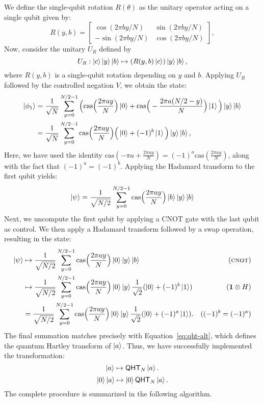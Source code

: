 \documentclass[12pt]{report}
\newcommand{\cas}{\mathrm{cas}}
\newcommand{\qht}{\mathsf{QHT}}
\begin{document}
We define the single-qubit rotation \( R(\theta) \) as the unitary operator acting on a single qubit given by:
\begin{equation}
    \label{eq:sine-rot}
    R(y, b) = 
    \begin{bmatrix}
        \cos(2\pi b y / N) & \sin(2\pi b y / N) \\
        -\sin(2\pi b y / N) & \cos(2\pi b y / N)
    \end{bmatrix},
\end{equation}
Now, consider the unitary \( U_R \) defined by
\[
U_R : \ket{c}\ket{y}\ket{b} \mapsto \left(R(y, b)\ket{c}\right)\ket{y}\ket{b},
\]
where \( R(y, b) \) is a single-qubit rotation depending on \( y \) and \( b \). Applying \( U_R \) followed by the controlled negation \( V \), we obtain the state:
\begin{align*}
    \ket{\phi_1}
    & = \frac{1}{\sqrt{N}} \sum_{y = 0}^{N / 2 - 1} \Big( \cas\Big( \frac{2\pi ay}{N} \Big) \ket{0} + \cas\Big(-\frac{2\pi a(N /2 - y)}{N} \Big) \ket{1} \Big) \ket{y} \ket{b} \\
    & = \frac{1}{\sqrt{N}} \sum_{y = 0}^{N / 2 - 1} \cas\Big( \frac{2\pi ay}{N} \Big) \Big( \ket{0} + (-1)^b \ket{1} \Big) \ket{y} \ket{b},
\end{align*}
Here, we have used the identity \( \cas\left(-\pi a + \frac{2\pi a y}{N}\right) = (-1)^a \cas\left(\frac{2\pi a y}{N}\right) \), along with the fact that \( (-1)^a = (-1)^b \). Applying the Hadamard transform to the first qubit yields:
\[
    \ket{\psi} = \frac{1}{\sqrt{N / 2}} \sum_{y = 0}^{N / 2 - 1} \cas\Big( \frac{2\pi ay}{N} \Big) \ket{b} \ket{y} \ket{b}
\]
Next, we uncompute the first qubit by applying a \textsc{CNOT} gate with the last qubit as control. We then apply a Hadamard transform followed by a swap operation, resulting in the state:
\begin{align*}
    \ket{\psi}
    & \mapsto \frac{1}{\sqrt{N / 2}} \sum_{y = 0}^{N / 2 - 1} \cas\Big( \frac{2\pi ay}{N} \Big) \ket{0} \ket{y} \ket{b} & (\textsc{cnot}) \\
    & \mapsto \frac{1}{\sqrt{N / 2}} \sum_{y = 0}^{N / 2 - 1} \cas\Big( \frac{2\pi ay}{N} \Big) \ket{0} \ket{y} \frac{1}{\sqrt{2}}(\ket{0} + (-1)^b \ket{1}) & (\mathbf{1} \otimes H) \\
    & = \frac{1}{\sqrt{N / 2}} \sum_{y = 0}^{N / 2 - 1} \cas\Big( \frac{2\pi ay}{N} \Big) \ket{0} \ket{y} \frac{1}{\sqrt{2}}(\ket{0} + (-1)^a \ket{1}). & ((-1)^b = (-1)^a) \\
\end{align*}
The final summation matches precisely with Equation~\eqref{eq:qht-alt}, which defines the quantum Hartley transform of \( \ket{a} \). Thus, we have successfully implemented the transformation:
\[
\ket{a} \mapsto \qht_N \ket{a}.
\]
\[ \ket{0}\ket{a} \mapsto \ket{0} \qht_N\ket{a}. \]
The complete procedure is summarized in the following algorithm.
\end{document}
